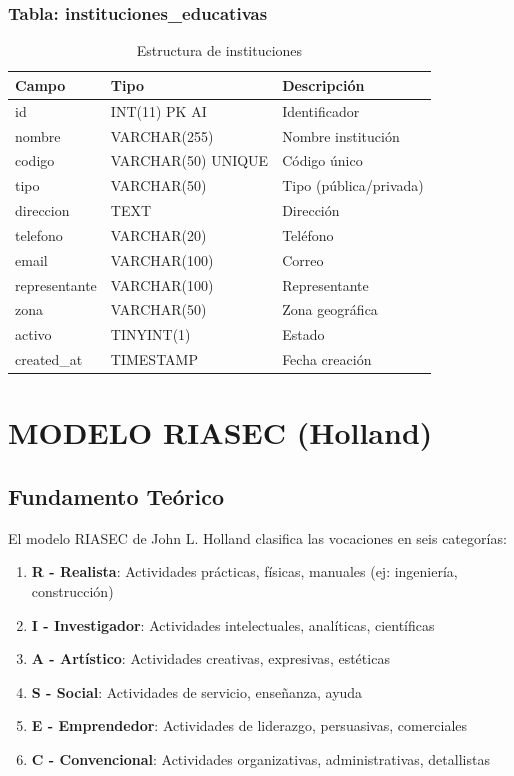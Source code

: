 \documentclass[12pt, a4paper]{report}
\begin{document}
\subsection{Tabla: instituciones\_educativas}
\begin{table}[H]
\centering
\begin{tabularx}{\textwidth}{|l|X|l|}
\hline
\textbf{Campo} & \textbf{Tipo} & \textbf{Descripción} \\
\hline
id & INT(11) PK AI & Identificador \\
nombre & VARCHAR(255) & Nombre institución \\
codigo & VARCHAR(50) UNIQUE & Código único \\
tipo & VARCHAR(50) & Tipo (pública/privada) \\
direccion & TEXT & Dirección \\
telefono & VARCHAR(20) & Teléfono \\
email & VARCHAR(100) & Correo \\
representante & VARCHAR(100) & Representante \\
zona & VARCHAR(50) & Zona geográfica \\
activo & TINYINT(1) & Estado \\
created\_at & TIMESTAMP & Fecha creación \\
\hline
\end{tabularx}
\caption{Estructura de instituciones}
\end{table}

\chapter{MODELO RIASEC (Holland)}

\section{Fundamento Teórico}
El modelo RIASEC de John L. Holland clasifica las vocaciones en seis categorías:
\begin{enumerate}[leftmargin=2cm]
    \item \textbf{R - Realista}: Actividades prácticas, físicas, manuales (ej: ingeniería, construcción)
    \item \textbf{I - Investigador}: Actividades intelectuales, analíticas, científicas
    \item \textbf{A - Artístico}: Actividades creativas, expresivas, estéticas
    \item \textbf{S - Social}: Actividades de servicio, enseñanza, ayuda
    \item \textbf{E - Emprendedor}: Actividades de liderazgo, persuasivas, comerciales
    \item \textbf{C - Convencional}: Actividades organizativas, administrativas, detallistas
\end{enumerate}
\end{document}
